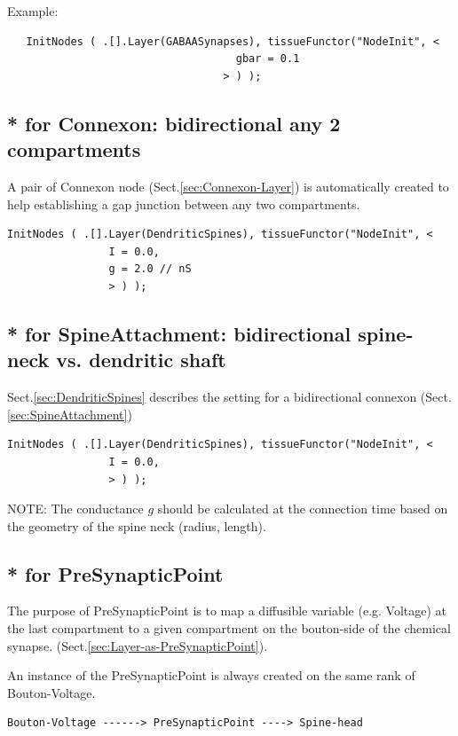 
Example:
\begin{verbatim}
   InitNodes ( .[].Layer(GABAASynapses), tissueFunctor("NodeInit", <
									gbar = 0.1
								  > ) );	
\end{verbatim}


\subsection{* for Connexon: bidirectional any 2 compartments}

A pair of  Connexon node (Sect.\ref{sec:Connexon-Layer}) is automatically
created to help establishing a gap junction between any two compartments.

\begin{verbatim}
InitNodes ( .[].Layer(DendriticSpines), tissueFunctor("NodeInit", <
				I = 0.0,
				g = 2.0 // nS
				> ) );
\end{verbatim}

\subsection{* for SpineAttachment: bidirectional spine-neck vs. dendritic shaft}

Sect.\ref{sec:DendriticSpines} describes the setting for a bidirectional
connexon (Sect.\ref{sec:SpineAttachment})

\begin{verbatim}
InitNodes ( .[].Layer(DendriticSpines), tissueFunctor("NodeInit", <
				I = 0.0,
				> ) );
\end{verbatim}
NOTE: The conductance $g$ should be calculated at the connection time based on
the geometry of the spine neck (radius, length).

\subsection{* for PreSynapticPoint}
\label{sec:PreSynapticPoint}

The purpose of PreSynapticPoint is to map a diffusible variable (e.g. Voltage)
at the last compartment to a given compartment on the bouton-side of the
chemical synapse. (Sect.\ref{sec:Layer-as-PreSynapticPoint}).

An instance of the PreSynapticPoint is always created on the same rank of
Bouton-Voltage.
\begin{verbatim}
Bouton-Voltage ------> PreSynapticPoint ----> Spine-head
\end{verbatim}

